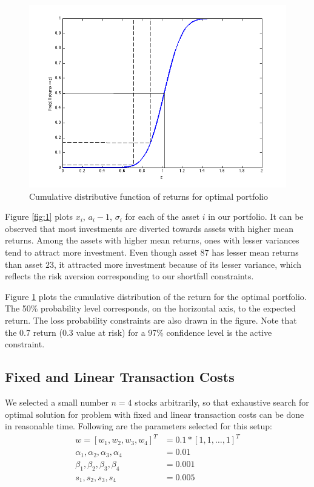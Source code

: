 \documentclass[a4paper]{article}
\begin{document}
\begin{figure}
\centering
\includegraphics[width=5in]{kaavali.png}
\caption{Cumulative distributive function of returns for optimal portfolio}
\label{fig:2}
\end{figure}

Figure \ref{fig:1} plots $x_i$, $a_i-1$, $\sigma_i$ for each of the asset $i$ in our portfolio. It can be observed that most investments are diverted towards assets with higher mean returns. Among the assets with higher mean returns, ones with lesser variances tend to attract more investment. 
Even though asset $87$ has lesser mean returns than asset $23$, it attracted more investment because of its lesser variance, which reflects the risk aversion corresponding to our shortfall constraints.

Figure \ref{fig:2} plots the cumulative distribution of the return for the optimal portfolio. The
50\% probability level corresponds, on the horizontal axis, to the expected return. The loss
probability constraints are also drawn in the figure. Note that the 0.7 return (0.3 value at risk)
for a 97\% confidence level is the active constraint.

\subsection{Fixed and Linear Transaction Costs}
We selected a small number $n = 4$ stocks arbitrarily, so that exhaustive search for optimal solution for problem with fixed and linear transaction costs can be done in reasonable time. 
Following are the parameters selected for this setup:
\begin{align*}
w=[w_1,w_2,w_3,w_{4}]^T&=0.1*[1,1,\ldots,1]^T\\
\alpha_1,\alpha_2,\alpha_3,\alpha_4 &=0.01\\
\beta_1,\beta_2,\beta_3,\beta_4 &= 0.001\\
s_1,s_2,s_3,s_4 &=0.005\\
\end{align*}
\end{document}
